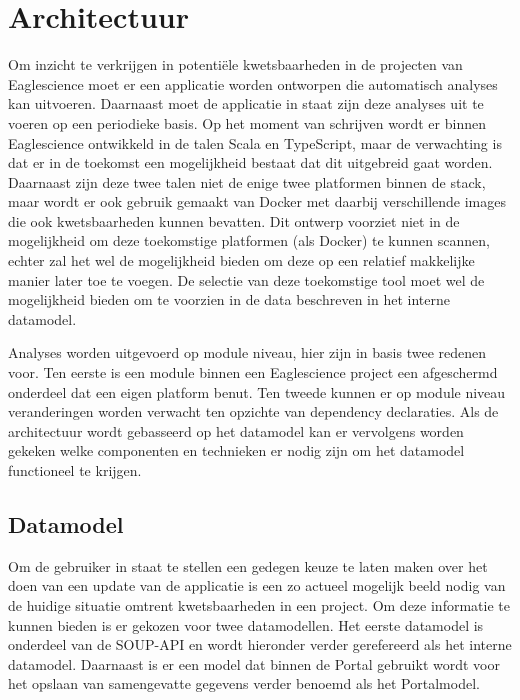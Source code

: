 \chapter{Architectuur}\label{ch:Architectuur}

Om inzicht te verkrijgen in potentiële kwetsbaarheden in de projecten van Eaglescience moet er een applicatie worden ontworpen die automatisch analyses kan uitvoeren. Daarnaast moet de applicatie in staat zijn deze analyses uit te voeren op een periodieke basis.
Op het moment van schrijven wordt er binnen Eaglescience ontwikkeld in de talen Scala en TypeScript, maar de verwachting is dat er in de toekomst een mogelijkheid bestaat dat dit uitgebreid gaat worden. Daarnaast zijn deze twee talen niet de enige twee platformen binnen de stack, maar wordt er ook gebruik gemaakt van Docker met daarbij verschillende images die ook kwetsbaarheden kunnen bevatten. Dit ontwerp voorziet niet in de mogelijkheid om deze toekomstige platformen (als Docker) te kunnen scannen, echter zal het wel de mogelijkheid bieden om deze op een relatief makkelijke manier later toe te voegen. De selectie van deze toekomstige tool moet wel de mogelijkheid bieden om te voorzien in de data beschreven in het interne datamodel.

Analyses worden uitgevoerd op module niveau, hier zijn in basis twee redenen voor. Ten eerste is een module binnen een Eaglescience project een afgeschermd onderdeel dat een eigen platform benut. Ten tweede kunnen er op module niveau veranderingen worden verwacht ten opzichte van dependency declaraties. Als de architectuur wordt gebasseerd op het datamodel kan er vervolgens worden gekeken welke componenten en technieken er nodig zijn om het datamodel functioneel te krijgen.


\section{Datamodel}\label{sec:datamodel}
Om de gebruiker in staat te stellen een gedegen keuze te laten maken over het doen van een update van de applicatie is een zo actueel mogelijk beeld nodig van de huidige situatie omtrent kwetsbaarheden in een project. Om deze informatie te kunnen bieden is er gekozen voor twee datamodellen.
Het eerste datamodel is onderdeel van de SOUP-API en wordt hieronder verder gerefereerd als het interne datamodel. Daarnaast is er een model dat binnen de Portal gebruikt wordt voor het opslaan van samengevatte gegevens verder benoemd als het Portalmodel.

